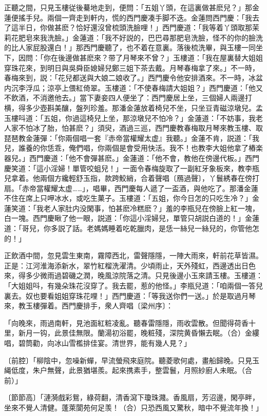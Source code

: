 正聽之間，只見玉樓従後驀地走到，便問：「五姐丫頭，在這裏做甚麽兒？」那金蓮便搖手兒。兩個一齊走到軒内，慌的西門慶凑手脚不迭。金蓮問西門慶：「我去了這半日，你做甚麽？恰好還沒曾梳頭洗臉哩！」西門慶道：「我等着丫頭取那茉莉花肥皂來我洗臉。」金蓮道：「我不好説的，巴巴尋那肥皂洗臉，怪不的你的臉洗的比人家屁股還白！」那西門慶聽了，也不着在意裏。落後梳洗畢，與玉樓一同坐下，因問：「你在後邊做甚麽來？带了月琴來不曾？」玉樓道：「我在屋裏替大姐姐穿珠花來，到明日與吳舜臣媳婦兒鄭三姐下茶去戴。月琴春梅拿了來。」不一時，春梅來到，説：「花兒都送與大娘二娘收了。」西門慶令他安排酒來。不一時，冰盆内沉李浮瓜；涼亭上偎紅倚翠。玉樓道：「不使春梅請大姐姐？」西門慶道：「他又不飲酒，不消邀他去。」當下妻妾四人便坐了：西門慶居上坐，三個婦人兩邊打横，得多少壺斟美釀，盤列珍羞。那潘金蓮放着椅兒不坐，只坐豆青磁涼墩兒。孟玉樓呌道：「五姐，你過這椅兒上坐，那涼墩兒不怕冷？」金蓮道：「不妨事，我老人家不怕冰了胎，怕甚麽？」須臾，酒過三巡，西門慶教春梅取月琴來教玉樓、取琵琶教金蓮彈：「你兩個唱一套『赤帝當權耀太虚』我聽。」金蓮不肯，説道：「我兒，誰養的你恁乖，俺們唱，你兩個是會受用快活。我不！也教李大姐他拿了樁楽器兒。」西門慶道：「他不會彈甚麽。」金蓮道：「他不會，教他在傍邊代板。」西門慶笑道：「這小淫婦！單管咬蛆兒！」一面令春梅旋取了一副紅牙象板來，教李瓶兒拿着。他兩個方纔輕舒玉指，款跨鮫綃，合着聲唱〔鴈過聲〕，丫鬟綉春在傍打扇。「赤帝當權耀太虚……」，唱畢，西門慶每人遞了一盃酒，與他吃了。那潘金蓮不住在席上只呷冰水，或吃生菓子。玉樓道：「五姐，你今日怎的只吃生冷？」金蓮笑道：「我老人家肚内没閑事，怕甚麽冷糕麽？」羞的李瓶兒在傍臉上紅一塊，白一塊。西門慶瞅了他一眼，説道：「你這小淫婦兒，單管只胡説白道的！」金蓮道：「哥兒，你多説了話。老媽媽睡着吃乾臘肉，是恁一絲兒一絲兒的，你管他怎的！」

正飲酒中間，忽見雲生東南，霧障西北，雷聲隱隱，一陣大雨來，軒前花草皆濕。正是：江河淮海添新水，翠竹紅榴洗濯清。少頃雨止，天外殘虹，西邊透出日色來，得多少微雨過碧磯之潤，晚風涼院落之清。只見後邊小玉來請玉樓。玉樓道：「大姐姐呌，有幾朵珠花沒穿了。我去罷，惹的他怪。」李瓶兒道：「咱兩個一答兒裏去。奴也要看姐姐穿珠花哩！」西門慶道：「等我送你們一送。」於是取過月琴來，教玉樓彈着。西門慶排手，衆人齊唱〔梁州序〕：

\begin{myquote}
「向晚來，雨過南軒，見池面紅粧凌亂。聽春雷隱隱，雨收雲散。但聞得荷香十里，新月一钩，此景佳無限。蘭湯初浴罷，晚粧殘，深院黄昏懶去眠。{\marktext（合）}金縷唱，碧筒勸，向冰山雪檻排佳宴。清世界，能有幾人見？」

{\markfont〔前腔〕}「柳陰中，忽噪新蟬，早流螢飛來庭院。聽菱歌何處，畫船歸晚。只見玉䋲低度，朱户無聲，此景猶堪羨。起來携素手，整雲鬟，月照紗廚人未眠。{\marktext（合前）}」

{\markfont〔節節高〕}「漣漪戲彩鴛，綠荷翻，清香瀉下瓊珠濺。香風扇，芳沼邊，閑亭畔，坐來不覺人清健。蓬萊閬苑何足羡！{\marktext（合）}只恐西風又驚秋，暗中不覺流年換！」
\end{myquote}

